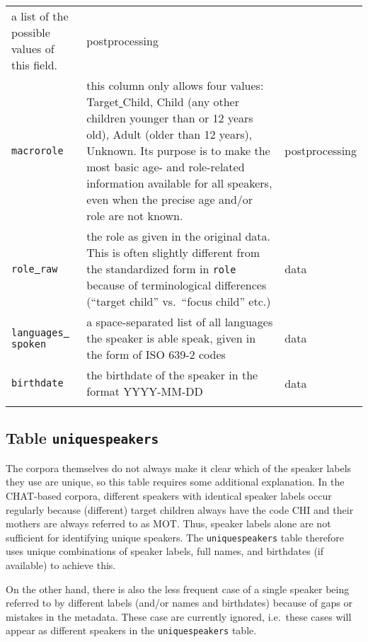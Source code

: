 \documentclass[a4paper, 11pt]{book}
\newcommand{\und}{\underline{{ }}\hspace{0.2mm}}	%
\begin{document}
\begin{longtable}{lp{.5\linewidth}p{.2\linewidth}}
								  a list of the possible values of this field. & postprocessing \\
		\texttt{macrorole} 		& this column only allows four values: Target\und Child, Child (any other children younger than or 12 years old), 
								  Adult (older than 12 years), Unknown. Its purpose is to make the most basic age- and role-related information
								  available for all speakers, even when the precise age and/or role are not known. & postprocessing \\
		\texttt{role\und raw} 	& the role as given in the original data. This is often slightly different from the standardized form in 
			  					  \texttt{role} because of terminological differences (“target child” vs.\ “focus child” etc.) & data \\
		\texttt{languages\und spoken} & a space-separated list of all languages the speaker is able speak, given in the form of ISO 639-2 codes & data \\
		\texttt{birthdate} 		& the birthdate of the speaker in the format YYYY-MM-DD & data \\[-0.3cm] 
	\label{tab:Table speakers}
\end{longtable}


\subsection{Table \texttt{uniquespeakers}}
\label{subsec:Table uniquespeakers}

The corpora themselves do not always make it clear which of the speaker labels they use are unique, so this table requires some additional explanation. 
In the CHAT-based corpora, different speakers with identical speaker labels occur regularly because (different) target children always have the code CHI and their mothers are always referred to as MOT. Thus, speaker labels alone are not sufficient for identifying unique speakers. The \texttt{uniquespeakers} table therefore uses unique combinations of speaker labels, full names, and birthdates (if available) to achieve this. %

On the other hand, there is also the less frequent case of a single speaker being referred to by different labels (and/or names and birthdates) because of gaps or mistakes in the metadata. These case are currently ignored, i.e.\ these cases will appear as different speakers in the \texttt{uniquespeakers} table. 
\end{document}
